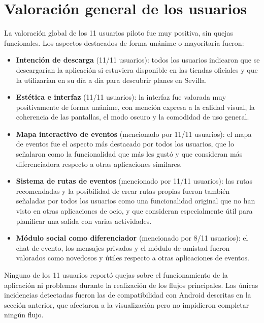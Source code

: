 \section{Valoración general de los usuarios}

La valoración global de los 11 usuarios piloto fue muy positiva, sin quejas funcionales. Los aspectos destacados de forma unánime o mayoritaria fueron:

\begin{itemize}
    \item \textbf{Intención de descarga} (11/11 usuarios): todos los usuarios indicaron que se descargarían la aplicación si estuviera disponible en las tiendas oficiales y que la utilizarían en su día a día para descubrir planes en Sevilla.

    \item \textbf{Estética e interfaz} (11/11 usuarios): la interfaz fue valorada muy positivamente de forma unánime, con mención expresa a la calidad visual, la coherencia de las pantallas, el modo oscuro y la comodidad de uso general.

    \item \textbf{Mapa interactivo de eventos} (mencionado por 11/11 usuarios): el mapa de eventos fue el aspecto más destacado por todos los usuarios, que lo señalaron como la funcionalidad que más les gustó y que consideran más diferenciadora respecto a otras aplicaciones similares.

    \item \textbf{Sistema de rutas de eventos} (mencionado por 11/11 usuarios): las rutas recomendadas y la posibilidad de crear rutas propias fueron también señaladas por todos los usuarios como una funcionalidad original que no han visto en otras aplicaciones de ocio, y que consideran especialmente útil para planificar una salida con varias actividades.

    \item \textbf{Módulo social como diferenciador} (mencionado por 8/11 usuarios): el chat de evento, los mensajes privados y el módulo de amistad fueron valorados como novedosos y útiles respecto a otras aplicaciones de eventos.
\end{itemize}

Ninguno de los 11 usuarios reportó quejas sobre el funcionamiento de la aplicación ni problemas durante la realización de los flujos principales. Las únicas incidencias detectadas fueron las de compatibilidad con Android descritas en la sección anterior, que afectaron a la visualización pero no impidieron completar ningún flujo.

